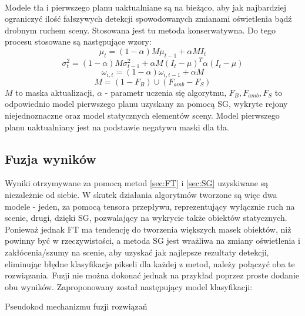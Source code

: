 \paragraph{}
Modele tła i pierwszego planu uaktualniane są na bieżąco, aby jak najbardziej ograniczyć ilość fałszywych detekcji spowodowanych zmianami oświetlenia bądź drobnym ruchem sceny. Stosowana jest tu metoda konserwatywna. Do tego procesu stosowane są następujące wzory:
\begin{equation}
\mu_{t} = (1-\alpha)M\mu_{t-1}+\alpha MI_{t}
\end{equation}
\begin{equation}
\sigma_{t}^2 = (1-\alpha)M\sigma_{t-1}^2+\alpha M(I_{t}-\mu)^{T}\alpha(I_{t}-\mu)
\end{equation}
\begin{equation}
\omega_{i,t} = (1-\alpha)\omega_{i,t-1}+\alpha M
\end{equation}
\begin{equation}
M = (1-F_{B})\cup(F_{amb}-F_{S})
\end{equation}
$M$ to maska aktualizacji, $\alpha$ - parametr uczenia się algorytmu, $F_{B}, F_{amb}, F_{S}$ to odpowiednio model pierwszego planu uzyskany za pomocą SG, wykryte rejony niejednoznaczne oraz model statycznych elementów sceny. Model pierwszego planu uaktualniany jest na podstawie negatywu maski dla tła.
\subsection{Fuzja wyników}
\label{sec:fuzja}
Wyniki otrzymywane za pomocą metod \ref{sec:FT} i \ref{sec:SG} uzyskiwane są niezależnie od siebie. W skutek działania algorytmów tworzone są więc dwa modele - jeden, za pomocą tensora przepływu, reprezentujący wyłącznie ruch na scenie, drugi, dzięki SG, pozwalający na wykrycie także obiektów statycznych. Ponieważ jednak FT ma tendencję do tworzenia większych masek obiektów, niż powinny być w rzeczywistości, a metoda SG jest wrażliwa na zmiany oświetlenia i zakłócenia/szumy na scenie, aby uzyskać jak najlepsze rezultaty detekcji, eliminując błędne klasyfikacje pikseli dla każdej z metod, należy połączyć oba te rozwiązania.  Fuzji nie można dokonać jednak na przykład poprzez proste dodanie obu wyników. Zaproponowany został następujący model klasyfikacji:
\begin{algorithm}[H]
 \caption{Pseudokod mechanizmu fuzji rozwiązań}
\end{algorithm}
